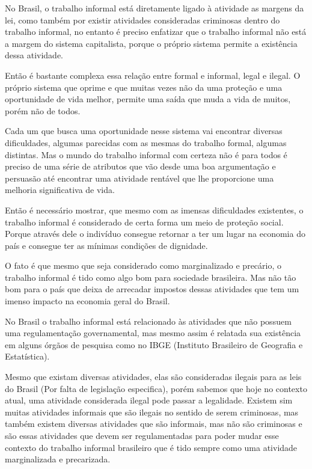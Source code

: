 No Brasil, o trabalho informal está diretamente ligado à atividade as margens da lei, como também por existir atividades consideradas criminosas dentro do trabalho informal, no entanto é preciso enfatizar que o trabalho informal não está a margem do sistema capitalista, porque o próprio sistema permite a existência dessa atividade.

Então é bastante complexa essa relação entre formal e informal, legal e ilegal. O próprio sistema que oprime e que muitas vezes não da uma proteção e uma oportunidade de vida melhor, permite uma saída que muda a vida de muitos, porém não de todos.


Cada um que busca uma oportunidade nesse sistema vai encontrar diversas dificuldades, algumas parecidas com as mesmas do trabalho formal, algumas distintas. Mas o mundo do trabalho informal com certeza não é para todos é preciso de uma série de atributos que vão desde uma boa argumentação e persuasão até encontrar uma atividade rentável que lhe proporcione uma melhoria significativa de vida. 

Então é necessário mostrar, que mesmo com as imensas dificuldades existentes, o trabalho informal é considerado de certa forma um meio de proteção social. Porque através dele o indivíduo consegue retornar a ter um lugar na economia do país e consegue ter as mínimas condições de dignidade.

O fato é que mesmo que seja considerado como marginalizado e precário, o trabalho informal é tido como algo bom para sociedade brasileira. Mas não tão bom para o país que deixa de arrecadar impostos dessas atividades que tem um imenso impacto na economia geral do Brasil.

No Brasil o trabalho informal está relacionado às atividades que não possuem uma regulamentação governamental, mas mesmo assim é relatada sua existência em alguns órgãos de pesquisa como no IBGE (Instituto Brasileiro de Geografia e Estatística). 

Mesmo que existam diversas atividades, elas são consideradas ilegais para as leis do Brasil (Por falta de legislação especifica), porém sabemos que hoje no contexto atual, uma atividade considerada ilegal pode passar a legalidade. Existem sim muitas atividades informais que são ilegais no sentido de serem criminosas, mas também existem diversas atividades que são informais, mas não são criminosas e são essas atividades que devem ser regulamentadas para poder mudar esse contexto do trabalho informal brasileiro que é tido sempre como uma atividade marginalizada e precarizada.


